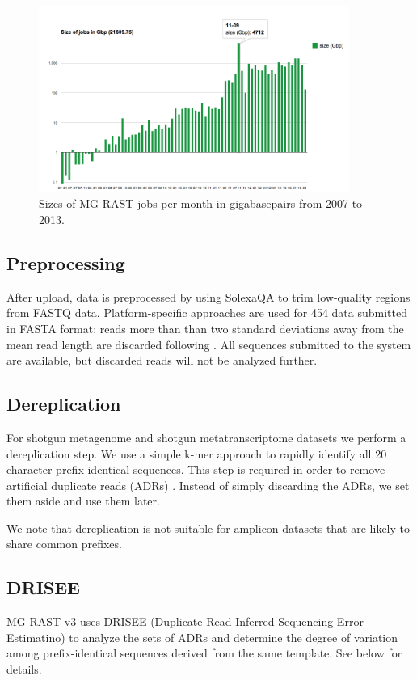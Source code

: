 \documentclass[12pt,fullpage]{report}
\begin{document}
\begin{figure}
\begin{center}
\includegraphics[width=4in]{Images/MG-RAST-job-sizes}
\end{center}
\caption{
Sizes of MG-RAST jobs per month in gigabasepairs from 2007 to 2013.}
\label{fig:mgrast-job-sizes}
\end{figure}


\subsection{Preprocessing}
After upload, data is preprocessed by using SolexaQA \cite{SOLEXAQA} to trim low-quality regions from FASTQ data. Platform-specific approaches are used for 454 data submitted in FASTA format: reads more than than two standard deviations away from the mean read length are discarded following \cite{HUSEPYRO}. All sequences submitted to the system are available, but discarded reads will not be analyzed further.

\subsection{Dereplication}
For shotgun metagenome and shotgun metatranscriptome datasets we perform a dereplication step.
We use a simple k-mer approach to rapidly identify all 20 character prefix identical sequences.
This step is required in order to remove artificial duplicate reads (\gls{ADR}s) \cite{ADRS}. Instead of simply discarding the ADRs, we set them aside and use them later.

We note that dereplication is not suitable for amplicon datasets that are likely to share common prefixes.

\subsection{DRISEE}
\label{section:DRISEE}
MG-RAST v3 uses DRISEE (Duplicate Read Inferred Sequencing Error Estimatino)\cite{DRISEE} to analyze the sets of ADRs \cite{ADRS} and determine the degree of variation among prefix-identical sequences derived from the same template. See below for details.
\end{document}
